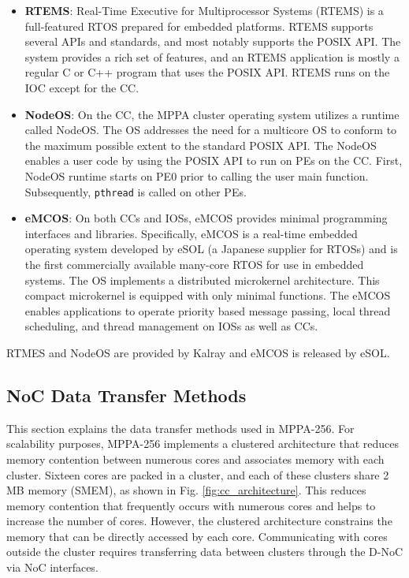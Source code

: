 \begin{itemize}
  \setlength{\leftskip}{-5mm}    
  \item \textbf{RTEMS}: Real-Time Executive for Multiprocessor Systems (RTEMS) is a full-featured RTOS prepared for embedded platforms.
  RTEMS supports several APIs and standards, and most notably supports the POSIX API.
  The system provides a rich set of features, and an RTEMS application is mostly a regular C or C++ program that uses the POSIX API.
  RTEMS runs on the IOC except for the CC.
  
  \item \textbf{NodeOS}: On the CC, the MPPA cluster operating system utilizes a runtime called NodeOS.
  The OS addresses the need for a multicore OS to conform to the maximum possible extent to the standard POSIX API.
  The NodeOS enables a user code by using the POSIX API to run on PEs on the CC.
  First, NodeOS runtime starts on PE0 prior to calling the user main function.
  Subsequently, \texttt{pthread} is called on other PEs.
  
  \item \textbf{eMCOS}: On both CCs and IOSs, eMCOS provides minimal programming interfaces and libraries.
  Specifically, eMCOS is a real-time embedded operating system developed by eSOL (a Japanese supplier for RTOSs) and is the first commercially available many-core RTOS for use in embedded systems.
  The OS implements a distributed microkernel architecture.
  This compact microkernel is equipped with only minimal functions.
  The eMCOS enables applications to operate priority based message passing, local thread scheduling, and thread management on IOSs as well as CCs.
\end{itemize}

RTMES and NodeOS are provided by Kalray and eMCOS is released by eSOL.

\subsection{NoC Data Transfer Methods}
\label{sec:data_transfer_methods}
This section explains the data transfer methods used in MPPA-256.
For scalability purposes, MPPA-256 implements a clustered architecture that reduces memory contention between numerous cores and associates memory with each cluster.
Sixteen cores are packed in a cluster, and each of these clusters share 2 MB memory (SMEM), as shown in Fig. \ref{fig:cc_architecture}.
This reduces memory contention that frequently occurs with numerous cores and helps to increase the number of cores.
However, the clustered architecture constrains the memory that can be directly accessed by each core.
Communicating with cores outside the cluster requires transferring data between clusters through the D-NoC via NoC interfaces.

